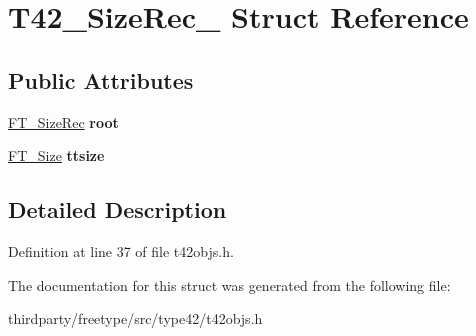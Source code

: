 \hypertarget{struct_t42___size_rec__}{}\section{T42\+\_\+\+Size\+Rec\+\_\+ Struct Reference}
\label{struct_t42___size_rec__}
\subsection*{Public Attributes}
\begin{DoxyCompactItemize}
\item 
\mbox{\label{struct_t42___size_rec___a92ff1c7203b325eac9d9849a1e349af1}} 
\hyperlink{struct_f_t___size_rec__}{F\+T\+\_\+\+Size\+Rec} {\bfseries root}
\item 
\mbox{\label{struct_t42___size_rec___ad04a45304bd0013d84332d5ceff1627b}} 
\hyperlink{struct_f_t___size_rec__}{F\+T\+\_\+\+Size} {\bfseries ttsize}
\end{DoxyCompactItemize}


\subsection{Detailed Description}


Definition at line 37 of file t42objs.\+h.



The documentation for this struct was generated from the following file\+:\begin{DoxyCompactItemize}
\item 
thirdparty/freetype/src/type42/t42objs.\+h\end{DoxyCompactItemize}
